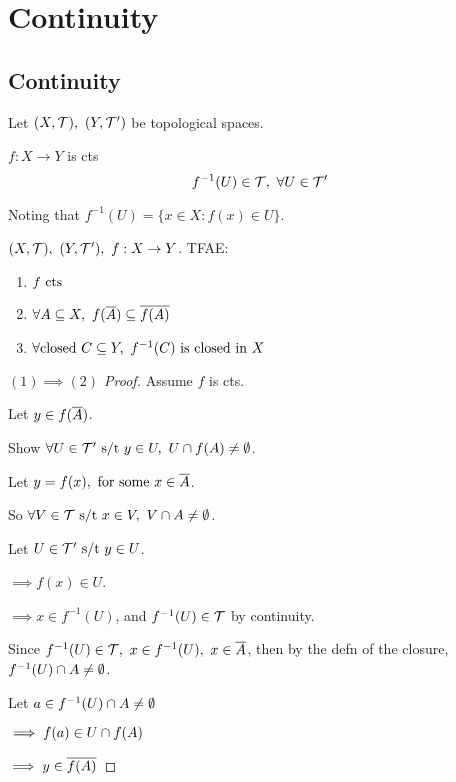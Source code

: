 \documentclass[12pt]{article}
\begin{document}
\section{Continuity}
\subsection{Continuity}

\bboxdefn
\begin{defn}
    Let \((X,\mathcal T),\ (Y,\mathcal T')\) be topological spaces.

    \(f:X\to Y\) is cts 
    \[
        f^{-1}(U)\in\mathcal T,\ \forall U\in\mathcal T'
    \]

    Noting that \(f^{-1}(U)=\{x\in X:f(x)\in U\}\).
\end{defn}
\ebox

\bboxprop
\begin{prop}
    \((X,\mathcal T),\ (Y,\mathcal T'),\ f:X\to Y\). TFAE:
    \begin{enumerate}
        \item \(f\ \mathrm{cts}\)
        \item \(\forall A\ssq X,\ f(\cls{A})\ssq\cls{f(A)}\)
        \item \(\forall\TR{closed}\ C\ssq Y,\ f^{-1}(C)\ \TR{is\ closed\ in}\ X\)
    \end{enumerate}
\end{prop}
\ebox

\bboxproof
\begin{proof}[\((1)\implies(2)\) Proof]
    Assume \(f\) is cts.

    Let \(y\in f(\overline{A})\).

    Show \(\forall U\in\mathcal T'\text{ s/t } y\in U,\ U\cap f(A)\neq \emptyset\).
    
    Let \(y=f(x),\ \TR{for\ some}\ x\in\cls{A}\).

    So \(\forall V\in\mathcal T\text{ s/t } x\in V,\ V\cap A\neq \emptyset\).

    Let \(U\in\mathcal T'\text{ s/t } y\in U\).

    \(\implies f(x)\in U\).

    \(\implies x\in f^{-1}(U)\), and \(f^{-1}(U)\in\mathcal T\) by continuity.

    Since \(f^{-1}(U)\in\TT,\ x\in f^{-1}(U),\ x\in\cls{A}\),
    then by the defn of the closure,
    \(f^{-1}(U)\cap A\neq \emptyset\).

    Let \(a\in f^{-1}(U)\cap A\neq\emptyset\)

    \(\implies f(a)\in U \cap f(A)\)

    \(\implies y \in \overline{f(A)}\)
\end{proof}
\ebox
\end{document}
